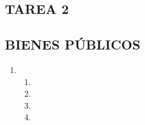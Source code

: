 \subsection*{\center TAREA 2}
\vspace{.4cm}
\subsection*{\center BIENES PÚBLICOS}
\vspace{1cm}

\begin{enumerate}

    \item 

    \begin{enumerate}[\bfseries a.]

	\item 

	\item 

	\item

	\item 

    \end{enumerate}

\end{enumerate}
